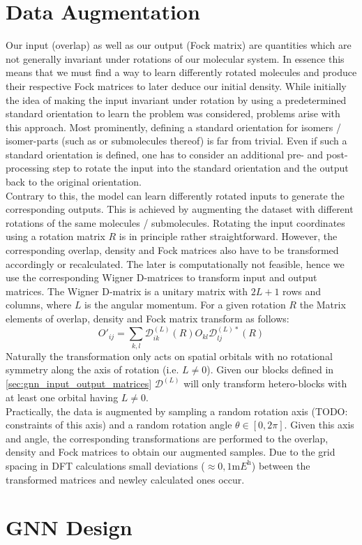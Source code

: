 \section{Data Augmentation}
\label{subsec:gnn_data_augmentation}
Our input (overlap) as well as our output (Fock matrix) are quantities which are not generally invariant under rotations of our molecular system. In essence this means that we must find a way to learn differently rotated molecules and produce their respective Fock matrices to later deduce our initial density. While initially the idea of making the input invariant under rotation by using a predetermined standard orientation to learn the problem was considered, problems arise with this approach. Most prominently, defining a standard orientation for isomers / isomer-parts (such as  or submolecules thereof) is far from trivial. Even if such a standard orientation is defined, one has to consider an additional pre- and post-processing step to rotate the input into the standard orientation and the output back to the original orientation. \\
Contrary to this, the model can learn differently rotated inputs to generate the corresponding outputs. This is achieved by augmenting the dataset with different rotations of the same molecules / submolecules. Rotating the input coordinates using a rotation matrix $R$ is in principle rather straightforward. However, the corresponding overlap, density and Fock matrices also have to be transformed accordingly or recalculated. The later is computationally not feasible, hence we use the corresponding Wigner D-matrices to transform input and output matrices. 
The Wigner D-matrix is a unitary matrix with $2L + 1$ rows and columns, where $L$ is the angular momentum. For a given rotation $R$ the Matrix elements of overlap, density and Fock matrix transform as follows:
\begin{equation}
    O'_{ij} = \sum_{k,l} \mathcal{D}^{(L)}_{ik}(R) O_{kl} \mathcal{D}^{(L)*}_{lj}(R)
\end{equation}
Naturally the transformation only acts on spatial orbitals with no rotational symmetry along the axis of rotation (i.e. $L \neq 0$). Given our blocks defined in \autoref{sec:gnn_input_output_matrices} $\mathcal{D}^{(L)}$ will only transform hetero-blocks with at least one orbital having $L \neq 0$. \\

Practically, the data is augmented by sampling a random rotation axis (TODO: constraints of this axis) and a random rotation angle $\theta \in [0, 2\pi]$. Given this axis and angle, the corresponding transformations are performed to the overlap, density and Fock matrices to obtain our augmented samples. 
Due to the grid spacing in DFT calculations small deviations ($\approx 0,1 \unit{\milli\hartree}$) between the transformed matrices and newley calculated ones occur.

\section{GNN Design}
\label{sec:gnn_design}
